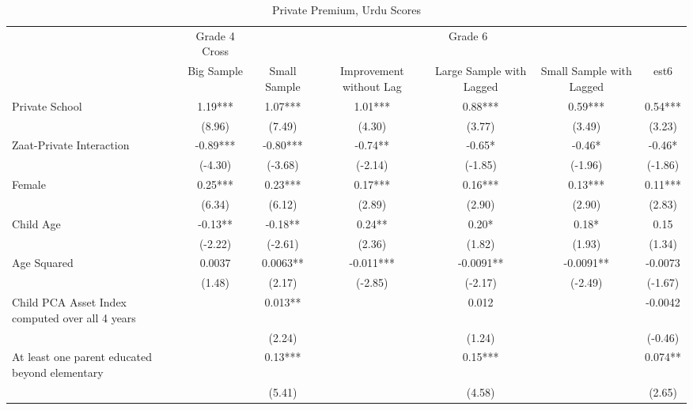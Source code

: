 \begin{sidewaystable}[htbp]\centering
\def\sym#1{\ifmmode^{#1}\else\(^{#1}\)\fi}
\caption{Private Premium, Urdu Scores}
\begin{tabular}{l*{6}{c}}
\toprule
                &\multicolumn{1}{c}{Grade 4 Cross}&\multicolumn{5}{c}{Grade 6}                                     \\\cmidrule(lr){2-2}\cmidrule(lr){3-7}
                &\multicolumn{1}{c}{Big Sample}&\multicolumn{1}{c}{Small Sample}&\multicolumn{1}{c}{Improvement without Lag}&\multicolumn{1}{c}{Large Sample with Lagged}&\multicolumn{1}{c}{Small Sample with Lagged}&\multicolumn{1}{c}{est6}\\
\midrule
Private School  &     1.19***&     1.07***&     1.01***&     0.88***&     0.59***&     0.54***\\
                &   (8.96)   &   (7.49)   &   (4.30)   &   (3.77)   &   (3.49)   &   (3.23)   \\
Zaat-Private Interaction&    -0.89***&    -0.80***&    -0.74** &    -0.65*  &    -0.46*  &    -0.46*  \\
                &  (-4.30)   &  (-3.68)   &  (-2.14)   &  (-1.85)   &  (-1.96)   &  (-1.86)   \\
Female          &     0.25***&     0.23***&     0.17***&     0.16***&     0.13***&     0.11***\\
                &   (6.34)   &   (6.12)   &   (2.89)   &   (2.90)   &   (2.90)   &   (2.83)   \\
Child Age       &    -0.13** &    -0.18** &     0.24** &     0.20*  &     0.18*  &     0.15   \\
                &  (-2.22)   &  (-2.61)   &   (2.36)   &   (1.82)   &   (1.93)   &   (1.34)   \\
Age Squared     &   0.0037   &   0.0063** &   -0.011***&  -0.0091** &  -0.0091** &  -0.0073   \\
                &   (1.48)   &   (2.17)   &  (-2.85)   &  (-2.17)   &  (-2.49)   &  (-1.67)   \\
Child PCA Asset Index computed over all 4 years&            &    0.013** &            &    0.012   &            &  -0.0042   \\
                &            &   (2.24)   &            &   (1.24)   &            &  (-0.46)   \\
At least one parent educated beyond elementary&            &     0.13***&            &     0.15***&            &    0.074** \\
                &            &   (5.41)   &            &   (4.58)   &            &   (2.65)   \\

\end{tabular}
\end{sidewaystable}
